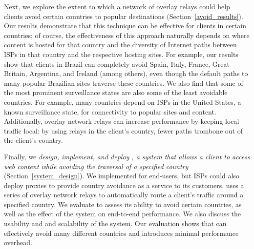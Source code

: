 Next, we {explore the extent to which a network of overlay relays could help
clients avoid certain countries to popular destinations}
(Section~\ref{avoid_results}). Our results demonstrate that this technique can
be effective for clients in certain countries; of course, the effectiveness of
this approach naturally depends on where content is hosted for that country
and the diversity of Internet paths between ISPs in that country and the
respective hosting sites. For example, our results show that clients in Brazil
can completely avoid Spain, Italy, France, Great Britain, Argentina, and
Ireland (among others), even though the default paths to many popular
Brazilian sites traverse these countries. We also find that some of the most
prominent surveillance states are also some of the least avoidable countries.
For example, many countries depend on ISPs in the United States, a known
surveillance state, for connectivity to popular sites and content.
Additionally, overlay network relays can increase performance by keeping local
traffic local: by using relays in the client's country, fewer paths trombone
out of the client's country.

Finally, we {\em design, implement, and deploy \system{}, a system that allows
a client to access web content while avoiding the traversal of a specified
country} (Section~\ref{system_design}).  We implemented \system{} for
end-users, 
but ISPs could also deploy \system{} proxies to provide country
avoidance as a service to its customers.  \system{} uses a series of overlay
network relays to automatically route a client's traffic around a specified
country.  We evaluate \system{} to assess its ability to avoid certain
countries, as well as the effect of the system on end-to-end performance. We
also discuss the usability and and scalability of the system.  Our evaluation
shows that \system{} can effectively avoid many different countries and
introduces minimal performance overhead. 
